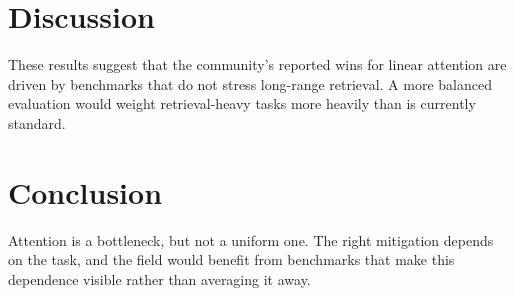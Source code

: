 \documentclass[11pt]{article}
\begin{document}
\section{Discussion}

These results suggest that the community's reported wins for linear attention are driven by benchmarks that do not stress long-range retrieval. A more balanced evaluation would weight retrieval-heavy tasks more heavily than is currently standard.

\section{Conclusion}

Attention is a bottleneck, but not a uniform one. The right mitigation depends on the task, and the field would benefit from benchmarks that make this dependence visible rather than averaging it away.
\end{document}
